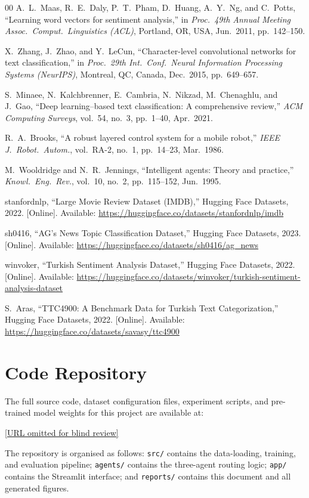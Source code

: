 \documentclass[conference]{IEEEtran}
\begin{document}
\begin{thebibliography}{00}
A.~L.~Maas, R.~E.~Daly, P.~T.~Pham, D.~Huang, A.~Y.~Ng, and C.~Potts,
``Learning word vectors for sentiment analysis,''
in \textit{Proc.\ 49th Annual Meeting Assoc.\ Comput.\ Linguistics (ACL)},
Portland, OR, USA, Jun.\ 2011, pp.~142--150.

X.~Zhang, J.~Zhao, and Y.~LeCun,
``Character-level convolutional networks for text classification,''
in \textit{Proc.\ 29th Int.\ Conf.\ Neural Information Processing Systems (NeurIPS)},
Montreal, QC, Canada, Dec.\ 2015, pp.~649--657.

S.~Minaee, N.~Kalchbrenner, E.~Cambria, N.~Nikzad, M.~Chenaghlu, and J.~Gao,
``Deep learning--based text classification: A comprehensive review,''
\textit{ACM Computing Surveys}, vol.~54, no.~3, pp.~1--40, Apr.\ 2021.

R.~A.~Brooks,
``A robust layered control system for a mobile robot,''
\textit{IEEE J.\ Robot.\ Autom.}, vol.~RA-2, no.~1, pp.~14--23, Mar.\ 1986.

M.~Wooldridge and N.~R.~Jennings,
``Intelligent agents: Theory and practice,''
\textit{Knowl.\ Eng.\ Rev.}, vol.~10, no.~2, pp.~115--152, Jun.\ 1995.

stanfordnlp,
``Large Movie Review Dataset (IMDB),''
Hugging Face Datasets, 2022.
[Online]. Available: \url{https://huggingface.co/datasets/stanfordnlp/imdb}

sh0416,
``AG's News Topic Classification Dataset,''
Hugging Face Datasets, 2023.
[Online]. Available: \url{https://huggingface.co/datasets/sh0416/ag_news}

winvoker,
``Turkish Sentiment Analysis Dataset,''
Hugging Face Datasets, 2022.
[Online]. Available: \url{https://huggingface.co/datasets/winvoker/turkish-sentiment-analysis-dataset}

S.~Aras,
``TTC4900: A Benchmark Data for Turkish Text Categorization,''
Hugging Face Datasets, 2022.
[Online]. Available: \url{https://huggingface.co/datasets/savasy/ttc4900}

\end{thebibliography}

\appendix
\section{Code Repository}
\label{appendix:code}

The full source code, dataset configuration files, experiment scripts, and pre-trained model
weights for this project are available at:

\begin{center}
  \url{[URL omitted for blind review]}
\end{center}

The repository is organised as follows: \texttt{src/} contains the data-loading, training,
and evaluation pipeline; \texttt{agents/} contains the three-agent routing logic;
\texttt{app/} contains the Streamlit interface; and \texttt{reports/} contains this
document and all generated figures.
\end{document}
